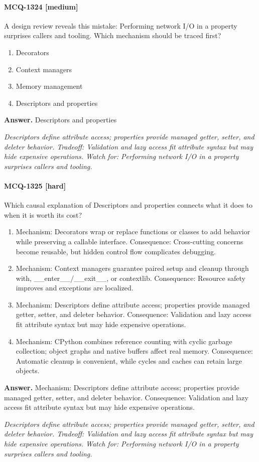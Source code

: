 \paragraph{MCQ-1324 [medium]} A design review reveals this mistake: Performing network I/O in a property surprises callers and tooling. Which mechanism should be traced first?
\begin{enumerate}[label=\Alph*.]
\item Decorators
\item Context managers
\item Memory management
\item Descriptors and properties
\end{enumerate}
\noindent\textbf{Answer.} Descriptors and properties
\par\textit{Descriptors define attribute access; properties provide managed getter, setter, and deleter behavior. Tradeoff: Validation and lazy access fit attribute syntax but may hide expensive operations. Watch for: Performing network I/O in a property surprises callers and tooling.}
\paragraph{MCQ-1325 [hard]} Which causal explanation of Descriptors and properties connects what it does to when it is worth its cost?
\begin{enumerate}[label=\Alph*.]
\item Mechanism: Decorators wrap or replace functions or classes to add behavior while preserving a callable interface. Consequence: Cross-cutting concerns become reusable, but hidden control flow complicates debugging.
\item Mechanism: Context managers guarantee paired setup and cleanup through with, \_\_enter\_\_/\_\_exit\_\_, or contextlib. Consequence: Resource safety improves and exceptions are localized.
\item Mechanism: Descriptors define attribute access; properties provide managed getter, setter, and deleter behavior. Consequence: Validation and lazy access fit attribute syntax but may hide expensive operations.
\item Mechanism: CPython combines reference counting with cyclic garbage collection; object graphs and native buffers affect real memory. Consequence: Automatic cleanup is convenient, while cycles and caches can retain large objects.
\end{enumerate}
\noindent\textbf{Answer.} Mechanism: Descriptors define attribute access; properties provide managed getter, setter, and deleter behavior. Consequence: Validation and lazy access fit attribute syntax but may hide expensive operations.
\par\textit{Descriptors define attribute access; properties provide managed getter, setter, and deleter behavior. Tradeoff: Validation and lazy access fit attribute syntax but may hide expensive operations. Watch for: Performing network I/O in a property surprises callers and tooling.}
